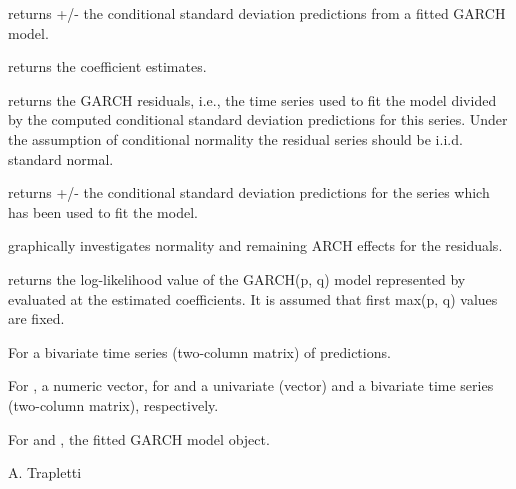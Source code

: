 \begin{Details}\relax
{} returns +/- the conditional standard deviation
predictions from a fitted GARCH model.

 returns the coefficient estimates.

 returns the GARCH residuals, i.e., the time series
used to fit the model divided by the computed conditional standard
deviation predictions for this series. Under the assumption of
conditional normality the residual series should be i.i.d. standard
normal.  

 returns +/- the conditional standard deviation
predictions for the series which has been used to fit the model.

 graphically investigates normality and remaining ARCH
effects for the residuals.

 returns the log-likelihood value of the GARCH(p, q)
model represented by  evaluated at the estimated
coefficients. It is assumed that first max(p, q) values are fixed.
\end{Details}
\begin{Value}
For  a bivariate time series (two-column matrix) of
predictions. 

For , a numeric vector, for  and
 a univariate (vector) and a bivariate time series
(two-column matrix), respectively.

For  and , the fitted GARCH model object.
\end{Value}
\begin{Author}\relax
A. Trapletti
\end{Author}

